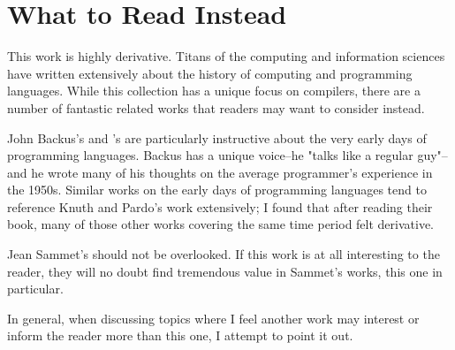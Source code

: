\chapter{What to Read Instead}

This work is highly derivative.
Titans of the computing and information sciences have written extensively
about the history of computing and programming languages.
While this collection has a unique focus on compilers, there are a number
of fantastic related works that readers may want to consider instead.

John Backus's 
and \citeauthor{Knuth_TrabbPardo_1976_Early_Development}'s
 are particularly instructive
about the very early days of programming languages.
Backus has a unique voice--he "talks like a regular guy"--and he wrote many of
his thoughts on the average programmer's experience in the 1950s.
Similar works on the early days of programming languages tend to reference
Knuth and Pardo's work extensively; I found that after reading their book,
many of those other works covering the same time period felt derivative.

Jean Sammet's 
should not be overlooked. If this work is at all interesting to the reader, they
will no doubt find tremendous value in Sammet's works, this one in particular.

In general, when discussing topics where I feel another work may interest or
inform the reader more than this one, I attempt to point it out.
